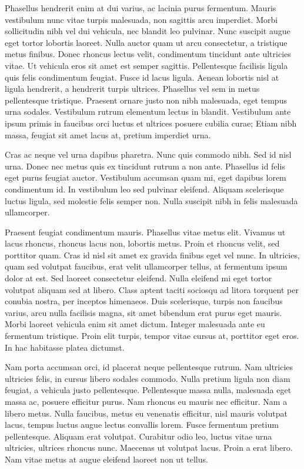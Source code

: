 \documentclass{article}
\begin{document}
Phasellus hendrerit enim at dui varius, ac lacinia purus fermentum. Mauris vestibulum nunc vitae turpis malesuada, non sagittis arcu imperdiet. Morbi sollicitudin nibh vel dui vehicula, nec blandit leo pulvinar. Nunc suscipit augue eget tortor lobortis laoreet. Nulla auctor quam ut arcu consectetur, a tristique metus finibus. Donec rhoncus lectus velit, condimentum tincidunt ante ultricies vitae. Ut vehicula eros sit amet est semper sagittis. Pellentesque facilisis ligula quis felis condimentum feugiat. Fusce id lacus ligula. Aenean lobortis nisl at ligula hendrerit, a hendrerit turpis ultrices. Phasellus vel sem in metus pellentesque tristique. Praesent ornare justo non nibh malesuada, eget tempus urna sodales. Vestibulum rutrum elementum lectus in blandit. Vestibulum ante ipsum primis in faucibus orci luctus et ultrices posuere cubilia curae; Etiam nibh massa, feugiat sit amet lacus at, pretium imperdiet urna.

Cras ac neque vel urna dapibus pharetra. Nunc quis commodo nibh. Sed id nisl urna. Donec nec metus quis ex tincidunt rutrum a non ante. Phasellus id felis eget purus feugiat auctor. Vestibulum accumsan quam mi, eget dapibus lorem condimentum id. In vestibulum leo sed pulvinar eleifend. Aliquam scelerisque luctus ligula, sed molestie felis semper non. Nulla suscipit nibh in felis malesuada ullamcorper.

Praesent feugiat condimentum mauris. Phasellus vitae metus elit. Vivamus ut lacus rhoncus, rhoncus lacus non, lobortis metus. Proin et rhoncus velit, sed porttitor quam. Cras id nisl sit amet ex gravida finibus eget vel nunc. In ultricies, quam sed volutpat faucibus, erat velit ullamcorper tellus, at fermentum ipsum dolor at est. Sed laoreet consectetur eleifend. Nulla eleifend mi eget tortor volutpat aliquam sed at libero. Class aptent taciti sociosqu ad litora torquent per conubia nostra, per inceptos himenaeos. Duis scelerisque, turpis non faucibus varius, arcu nulla facilisis magna, sit amet bibendum erat purus eget mauris. Morbi laoreet vehicula enim sit amet dictum. Integer malesuada ante eu fermentum tristique. Proin elit turpis, tempor vitae cursus at, porttitor eget eros. In hac habitasse platea dictumst.

Nam porta accumsan orci, id placerat neque pellentesque rutrum. Nam ultricies ultricies felis, in cursus libero sodales commodo. Nulla pretium ligula non diam feugiat, a vehicula justo pellentesque. Pellentesque massa nulla, malesuada eget massa ac, posuere efficitur purus. Nam rhoncus eu mauris nec efficitur. Nam a libero metus. Nulla faucibus, metus eu venenatis efficitur, nisl mauris volutpat lacus, tempus luctus augue lectus convallis lorem. Fusce fermentum pretium pellentesque. Aliquam erat volutpat. Curabitur odio leo, luctus vitae urna ultricies, ultrices rhoncus nunc. Maecenas ut volutpat lacus. Proin a erat libero. Nam vitae metus at augue eleifend laoreet non ut tellus.
\end{document}
